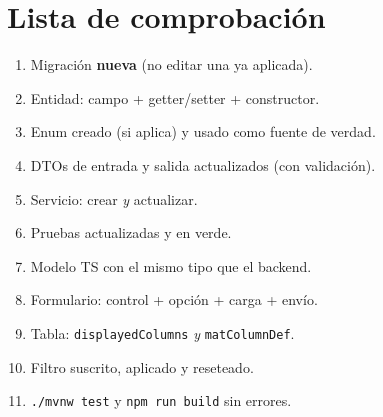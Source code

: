 \documentclass[11pt,a4paper]{article}
\begin{document}
\section{Lista de comprobación}
\begin{enumerate}[leftmargin=1.6em]
  \item[$\square$] Migración \textbf{nueva} (no editar una ya aplicada).
  \item[$\square$] Entidad: campo + getter/setter + constructor.
  \item[$\square$] Enum creado (si aplica) y usado como fuente de verdad.
  \item[$\square$] DTOs de entrada y salida actualizados (con validación).
  \item[$\square$] Servicio: crear \emph{y} actualizar.
  \item[$\square$] Pruebas actualizadas y en verde.
  \item[$\square$] Modelo TS con el mismo tipo que el backend.
  \item[$\square$] Formulario: control + opción + carga + envío.
  \item[$\square$] Tabla: \texttt{displayedColumns} \emph{y} \texttt{matColumnDef}.
  \item[$\square$] Filtro suscrito, aplicado y reseteado.
  \item[$\square$] \texttt{./mvnw test} y \texttt{npm run build} sin errores.
\end{enumerate}

\end{document}
